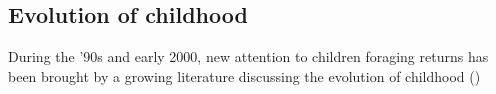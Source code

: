 

\subsection{Evolution of childhood}
During the '90s and early 2000, new attention to children foraging returns has been brought by a growing literature discussing the evolution of childhood (\cite{bogin_evolutionary_1997})%

